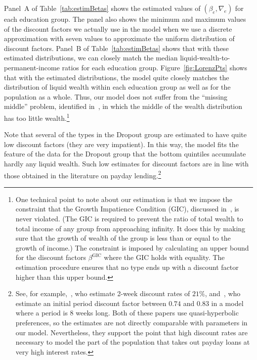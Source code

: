\documentclass{econsocart}
\begin{document}
Panel~A of Table~\ref{tab:estimBetas} shows the estimated values of $(\beta_e, \nabla_e)$ for each education group.
The panel also shows the minimum and maximum values of the discount factors we actually use in the model when we use a discrete approximation with seven values to approximate the uniform distribution of discount factors.
Panel~B of Table~\ref{tab:estimBetas} shows that with these estimated distributions, we can closely match the median liquid-wealth-to-permanent-income ratios for each education group.
Figure~\ref{fig:LorenzPts} shows that with the estimated distributions, the model quite closely matches the distribution of liquid wealth within each education group as well as for the population as a whole.
Thus, our model does not suffer from the ``missing middle'' problem, identified in~\cite{kaplanMPC2022}, in which the middle of the wealth distribution has too little wealth.\footnote{One technical point to note about our estimation is that we impose the constraint that the Growth Impatience Condition (GIC), discussed in~\cite{carroll2022theoretical}, is never violated. (The GIC is required to prevent the ratio of total wealth to total income of any group from approaching infinity. It does this by making sure that the growth of wealth of the group is less than or equal to the growth of income.) The constraint is imposed by calculating an upper bound for the discount factors $\beta^{\text{GIC}}$ where the GIC holds with equality. The estimation procedure ensures that no type ends up with a discount factor higher than this upper bound.}



Note that several of the types in the Dropout group are estimated to have quite low discount factors (they are very impatient).
In this way, the model fits the feature of the data for the Dropout group that the bottom quintiles accumulate hardly any liquid wealth.
Such low estimates for discount factors are in line with those obtained in the literature on payday lending.\footnote{See, for example,~\cite{skiba2008payday}, who estimate 2-week discount rates of $21\%$, and~\cite{allcott2022high}, who estimate an initial period discount factor between $0.74$ and $0.83$ in a model where a period is 8 weeks long.
  Both of these papers use quasi-hyperbolic preferences, so the estimates are not directly comparable with parameters in our model.
  Nevertheless, they support the point that high discount rates are necessary to model the part of the population that takes out payday loans at very high interest rates.}
\end{document}
